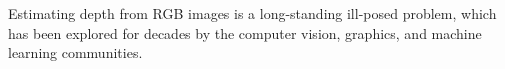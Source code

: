 
Estimating depth from RGB images is a long-standing ill-posed problem, which has been explored for decades by the computer vision, graphics, and machine learning communities.